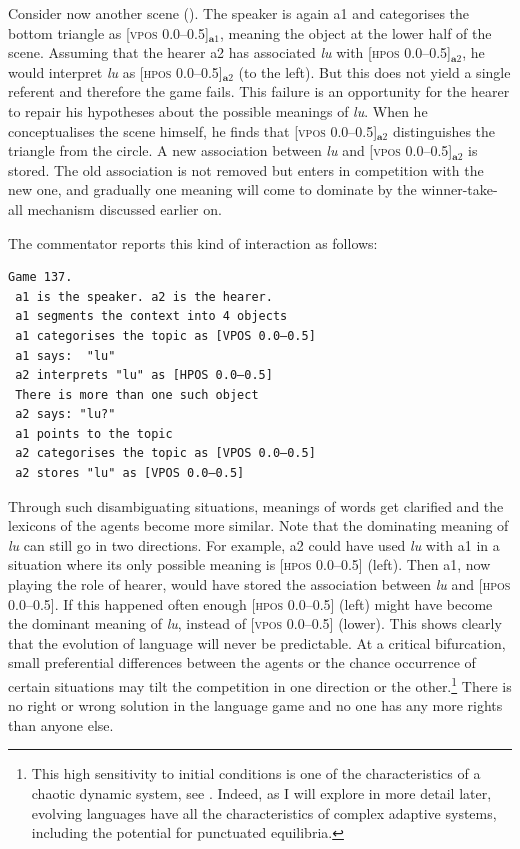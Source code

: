 Consider now another scene (). The speaker
is again {\bfshape a1} and categorises the bottom triangle as 
[\textsc{vpos} 0.0–0.5]$_{\mathbf  a1}$, meaning
the object at the lower half of the scene. Assuming that the
hearer {\bfshape a2} has associated \textit{lu} with [\textsc{hpos} 0.0–0.5]$_{\mathbf  a2}$, he
would interpret \textit{lu} as [\textsc{hpos} 0.0–0.5]$_{\mathbf  a2}$ (to the left). But this 
does not yield a single 
referent and therefore the game fails. 
This failure is an opportunity for the hearer to repair his 
hypotheses about the possible meanings of \textit{lu}.
When he conceptualises the scene himself, 
he finds that [\textsc{vpos} 0.0–0.5]$_{\mathbf  a2}$ distinguishes the triangle
from the circle. A new association between 
\textit{lu} and [\textsc{vpos} 0.0–0.5]$_{\mathbf  a2}$ is stored. The old association
is not removed but enters in competition with the new
one, and gradually one meaning will come to dominate
by the winner-take-all mechanism discussed earlier on. 

The commentator reports this kind of interaction as follows: 
\begin{verbatim}
Game 137.
 a1 is the speaker. a2 is the hearer. 
 a1 segments the context into 4 objects
 a1 categorises the topic as [VPOS 0.0–0.5]
 a1 says:  "lu"
 a2 interprets "lu" as [HPOS 0.0–0.5]
 There is more than one such object
 a2 says: "lu?"
 a1 points to the topic
 a2 categorises the topic as [VPOS 0.0–0.5]
 a2 stores "lu" as [VPOS 0.0–0.5]
\end{verbatim}

Through such disambiguating situations, meanings of words
get clarified and the lexicons of the agents
become more similar. Note that the 
dominating meaning of \textit{lu} can still go in 
two directions. For example, {\bfshape a2}
could have used \textit{lu} with {\bfshape a1} 
in a situation where its only possible meaning 
is [\textsc{hpos} 0.0–0.5] (left). Then {\bfshape a1}, now playing the role
of hearer, would have stored the association between
\textit{lu} and [\textsc{hpos} 0.0–0.5]. If this happened often 
enough [\textsc{hpos} 0.0–0.5] (left) might
have become the dominant meaning of \textit{lu}, instead of 
[\textsc{vpos} 0.0–0.5] (lower). This shows clearly that the 
evolution of language will never be predictable. At a critical 
bifurcation, small preferential differences between 
the agents or the chance occurrence of certain situations
may tilt the competition in one direction or the other.\footnote{This high sensitivity to initial conditions is 
one of the characteristics of a chaotic dynamic
system, see \cite{Lorenz:1993}.
Indeed, as I will explore in more detail later, 
evolving languages have all the characteristics
of complex adaptive systems, including the 
potential for punctuated equilibria.}
There is no right
or wrong solution in the language game and no one has
any more rights than anyone else. 

